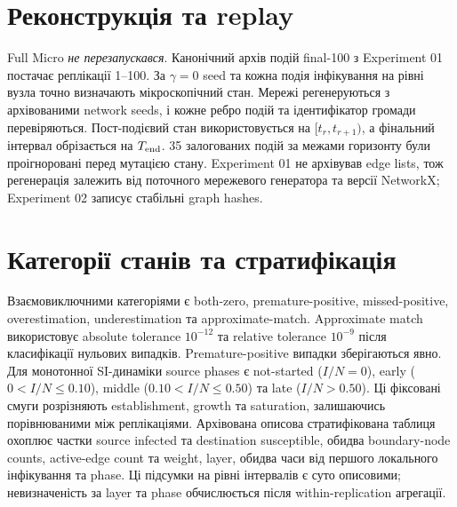 \documentclass[11pt]{article}
\begin{document}
\section{Реконструкція та replay}
Full Micro \emph{не перезапускався}. Канонічний архів подій final-100 з Experiment 01 постачає реплікації 1--100. За $\gamma=0$ seed та кожна подія інфікування на рівні вузла точно визначають мікроскопічний стан. Мережі регенеруються з архівованими network seeds, і кожне ребро подій та ідентифікатор громади перевіряються. Пост-подієвий стан використовується на $[t_r,t_{r+1})$, а фінальний інтервал обрізається на $T_{\rm end}$. 35 залогованих подій за межами горизонту були проігноровані перед мутацією стану. Experiment 01 не архівував edge lists, тож регенерація залежить від поточного мережевого генератора та версії NetworkX; Experiment 02 записує стабільні graph hashes.

\section{Категорії станів та стратифікація}
Взаємовиключними категоріями є both-zero, premature-positive, missed-positive, overestimation, underestimation та approximate-match. Approximate match використовує absolute tolerance $10^{-12}$ та relative tolerance $10^{-9}$ після класифікації нульових випадків. Premature-positive випадки зберігаються явно. Для монотонної SI-динаміки source phases є not-started ($I/N=0$), early ($0<I/N\le0.10$), middle ($0.10<I/N\le0.50$) та late ($I/N>0.50$). Ці фіксовані смуги розрізняють establishment, growth та saturation, залишаючись порівнюваними між реплікаціями. Архівована описова стратифікована таблиця охоплює частки source infected та destination susceptible, обидва boundary-node counts, active-edge count та weight, layer, обидва часи від першого локального інфікування та phase. Ці підсумки на рівні інтервалів є суто описовими; невизначеність за layer та phase обчислюється після within-replication агрегації.
\end{document}
